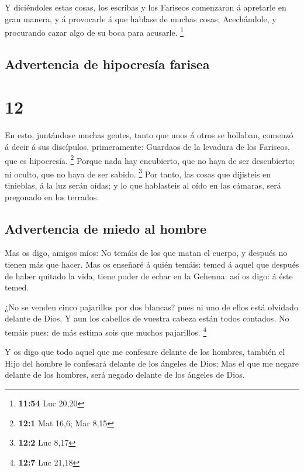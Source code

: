  Y diciéndoles estas cosas, los escribas y los Fariseos
comenzaron á apretarle en gran manera, y á provocarle á que hablase de
muchas cosas;  Acechándole, y procurando cazar algo de su
boca para acusarle. \footnote{\textbf{11:54} Luc 20,20}

\hypertarget{advertencia-de-hipocresuxeda-farisea}{%
\subsection{Advertencia de hipocresía
farisea}\label{advertencia-de-hipocresuxeda-farisea}}

\hypertarget{section-11}{%
\section{12}\label{section-11}}

 En esto, juntándose muchas gentes, tanto que unos á otros
se hollaban, comenzó á decir á sus discípulos, primeramente: Guardaos de
la levadura de los Fariseos, que es hipocresía. \footnote{\textbf{12:1}
  Mat 16,6; Mar 8,15}  Porque nada hay encubierto, que no
haya de ser descubierto; ni oculto, que no haya de ser sabido.
\footnote{\textbf{12:2} Luc 8,17}  Por tanto, las cosas
que dijisteis en tinieblas, á la luz serán oídas; y lo que hablasteis al
oído en las cámaras, será pregonado en los terrados.

\hypertarget{advertencia-de-miedo-al-hombre}{%
\subsection{Advertencia de miedo al
hombre}\label{advertencia-de-miedo-al-hombre}}

 Mas os digo, amigos míos: No temáis de los que matan el
cuerpo, y después no tienen más que hacer.  Mas os
enseñaré á quién temáis: temed á aquel que después de haber quitado la
vida, tiene poder de echar en la Gehenna: así os digo: á éste temed.

 ¿No se venden cinco pajarillos por dos blancas? pues ni
uno de ellos está olvidado delante de Dios.  Y aun los
cabellos de vuestra cabeza están todos contados. No temáis pues: de más
estima sois que muchos pajarillos. \footnote{\textbf{12:7} Luc 21,18}

 Y os digo que todo aquel que me confesare delante de los
hombres, también el Hijo del hombre le confesará delante de los ángeles
de Dios;  Mas el que me negare delante de los hombres,
será negado delante de los ángeles de Dios.

